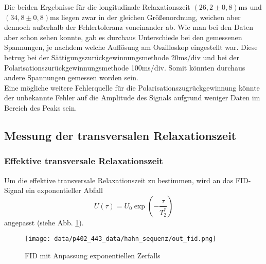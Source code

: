 Die beiden Ergebnisse für die longitudinale Relaxationszeit $(26,2\pm 0,8) \si{\milli\second}$ und $(34,8\pm 0,8) \si{\milli\second}$ liegen zwar in der gleichen Größenordnung, weichen aber dennoch außerhalb der Fehlertoleranz voneinander ab. Wie man bei den Daten aber schon sehen konnte, gab es durchaus Unterschiede bei den gemessenen Spannungen, je nachdem welche Auflösung am Oszilloskop eingestellt war. Diese betrug bei der Sättigungszurückgewinnungsmethode 20\si{\milli\second}/div und bei der Polarisationszurückgewinnungsmethode 100\si{\milli\second}/div. Somit könnten durchaus andere Spannungen gemessen worden sein.\\
Eine mögliche weitere Fehlerquelle für die Polarisationszugrückgewinnung könnte der unbekannte Fehler auf die Amplitude des Signals aufgrund weniger Daten im Bereich des Peaks sein.


\subsection{Messung der transversalen Relaxationszeit}
\subsubsection{Effektive transversale Relaxationszeit}
Um die effektive transversale Relaxationszeit zu bestimmen, wird an das FID-Signal ein exponentieller Abfall $$U(\tau) = U_0\exp{\left(-\frac{\tau}{T_2^*}\right)}$$ angepasst (siehe Abb. \ref{fig:hahn_fid}).

\begin{figure}[h]
\centering
\texttt{[image: data/p402\_443\_data/hahn\_sequenz/out\_fid.png]}
\caption{FID mit Anpassung exponentiellen Zerfalls}
\label{fig:hahn_fid}
\end{figure}

